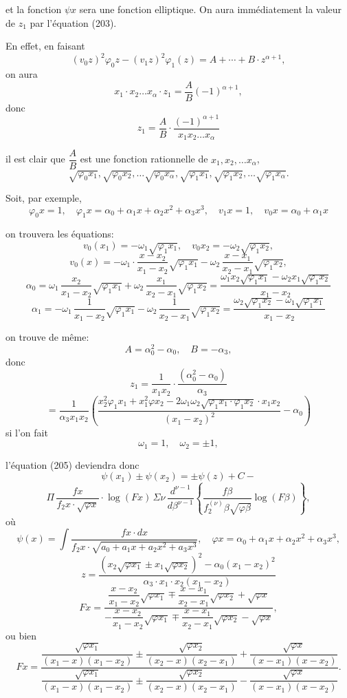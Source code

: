 \documentclass{article}
\begin{document}
et la fonction $\psi x$ sera une fonction elliptique.
On aura immédiatement la valeur de $z_1$ par l'équation (203).

En effet, en faisant
\[ (v_0 z)^{2}\varphi_0 z-(v_1 z)^{2}\varphi_1(z) = A+\cdots+B \cdot z^{\alpha+1}, \]
on aura
\[ x_1 \cdot x_2 \ldots x_\alpha \cdot z_1 = \frac{A}{B}(-1)^{\alpha+1}, \]
donc
\[ z_1 = \frac{A}{B} \cdot \frac{(-1)^{\alpha+1}}{x_1 x_2 \ldots x_\alpha} \]

il est clair que $\dfrac{A}{B}$ est une fonction rationnelle de $x_1, x_2, \ldots x_\alpha$,
\[ \sqrt{\varphi_0 x_1}, \sqrt{\varphi_0 x_2}, \ldots \sqrt{\varphi_0 x_\alpha}, \sqrt{\varphi_1 x_1}, \sqrt{\varphi_1 x_2}, \ldots \sqrt{\varphi_1 x_\alpha}. \]

Soit, par exemple,
\[ \varphi_0 x = 1, \quad \varphi_1 x = \alpha_0+\alpha_1 x+\alpha_2 x^{2}+\alpha_3 x^{3}, \quad v_1 x = 1, \quad v_0 x = \alpha_0+\alpha_1 x \]

on trouvera les équations:
\[ v_0(x_1) = -\omega_1\sqrt{\varphi_1 x_1}, \quad v_0 x_2 = -\omega_2\sqrt{\varphi_1 x_2}, \]
\[ v_0(x) = -\omega_1 \cdot \frac{x-x_2}{x_1-x_2}\sqrt{\varphi_1 x_1} - \omega_2\,\frac{x-x_1}{x_2-x_1}\sqrt{\varphi_1 x_2}, \]
\[ \alpha_0 = \omega_1\,\frac{x_2}{x_1-x_2}\sqrt{\varphi_1 x_1}+\omega_2\,\frac{x_1}{x_2-x_1}\sqrt{\varphi_1 x_2} = \frac{\omega_1 x_2\sqrt{\varphi_1 x_1}-\omega_2 x_1\sqrt{\varphi_1 x_2}}{x_1-x_2} \]
\[ \alpha_1 = -\omega_1\,\frac{1}{x_1-x_2}\sqrt{\varphi_1 x_1}-\omega_2\,\frac{1}{x_2-x_1}\sqrt{\varphi_1 x_2} = \frac{\omega_2\sqrt{\varphi_1 x_2}-\omega_1\sqrt{\varphi_1 x_1}}{x_1-x_2} \]

on trouve de même:
\[ A = \alpha_0^{2}-\alpha_0, \quad B = -\alpha_3, \]
donc
\[ z_1 = \frac{1}{x_1 x_2} \cdot \frac{(\alpha_0^{2}-\alpha_0)}{\alpha_3} \]
\[ = \frac{1}{\alpha_3 x_1 x_2}\left(\frac{x_2^{2}\varphi_1 x_1+x_1^{2}\varphi x_2-2\omega_1\omega_2\sqrt{\varphi_1 x_1 \cdot \varphi_1 x_2} \cdot x_1 x_2}{(x_1-x_2)^{2}}-\alpha_0\right) \]
si l'on fait
\[ \omega_1 = 1, \quad \omega_2 = \pm 1, \]

l'équation (205) deviendra donc
\[ \psi(x_1) \pm \psi(x_2) = \pm\psi(z) + C - \]
\[ \Pi\,\frac{f x}{f_2 x \cdot \sqrt{\varphi x}} \cdot \log(F x)\,\Sigma\nu\,\frac{d^{\nu-1}}{d\beta^{\nu-1}} \left\{ \frac{f\beta}{f_2^{(\nu)}\beta\sqrt{\varphi\beta}}\log(F\beta) \right\}, \tag{206} \]
où
\[ \psi(x) = \int \frac{f x \cdot dx}{f_2 x \cdot \sqrt{a_0+a_1 x+a_2 x^{2}+a_3 x^{3}}}, \quad \varphi x = \alpha_0+\alpha_1 x+\alpha_2 x^{2}+\alpha_3 x^{3}, \]
\[ z = \frac{\left(x_2\sqrt{\varphi x_1} \pm x_1\sqrt{\varphi x_2}\right)^{2}-\alpha_0(x_1-x_2)^{2}}{\alpha_3 \cdot x_1 \cdot x_2(x_1-x_2)} \]
\[ F x = \dfrac{\dfrac{x-x_2}{x_1-x_2}\sqrt{\varphi x_1} \mp \dfrac{x-x_1}{x_2-x_1}\sqrt{\varphi x_2} + \sqrt{\varphi x}}{-\dfrac{x-x_2}{x_1-x_2}\sqrt{\varphi x_1} \mp \dfrac{x-x_1}{x_2-x_1}\sqrt{\varphi x_2} - \sqrt{\varphi x}}, \]
ou bien
\[ F x = \dfrac{\dfrac{\sqrt{\varphi x_1}}{(x_1-x)(x_1-x_2)} \pm \dfrac{\sqrt{\varphi x_2}}{(x_2-x)(x_2-x_1)} + \dfrac{\sqrt{\varphi x}}{(x-x_1)(x-x_2)}}{\dfrac{\sqrt{\varphi x_1}}{(x_1-x)(x_1-x_2)} \pm \dfrac{\sqrt{\varphi x_2}}{(x_2-x)(x_2-x_1)} - \dfrac{\sqrt{\varphi x}}{(x-x_1)(x-x_2)}}. \]
\end{document}
